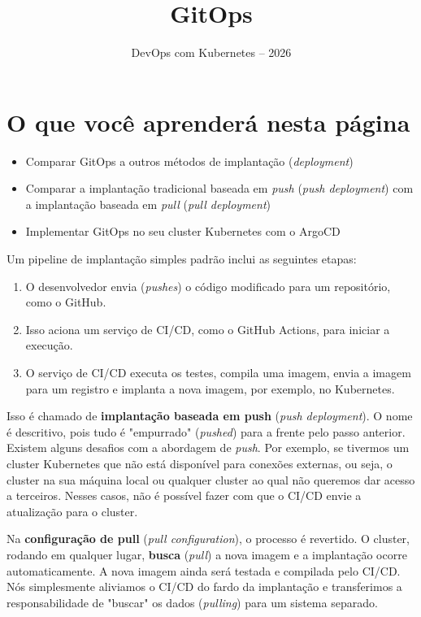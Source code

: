 \documentclass[11pt,a4paper]{article}
\title{\color{secondary}\Huge\textbf{GitOps}}
\author{\color{primary}DevOps com Kubernetes -- 2026}
\date{}
\begin{document}
\maketitle

\section*{\color{primary}O que você aprenderá nesta página}
\begin{itemize}
    \item Comparar GitOps a outros métodos de implantação (\textit{deployment})
    \item Comparar a implantação tradicional baseada em \textit{push} (\textit{push deployment}) com a implantação baseada em \textit{pull} (\textit{pull deployment})
    \item Implementar GitOps no seu cluster Kubernetes com o ArgoCD
\end{itemize}

Um pipeline de implantação simples padrão inclui as seguintes etapas:
\begin{enumerate}
    \item O desenvolvedor envia (\textit{pushes}) o código modificado para um repositório, como o GitHub.
    \item Isso aciona um serviço de CI/CD, como o GitHub Actions, para iniciar a execução.
    \item O serviço de CI/CD executa os testes, compila uma imagem, envia a imagem para um registro e implanta a nova imagem, por exemplo, no Kubernetes.
\end{enumerate}

Isso é chamado de \textbf{implantação baseada em push} (\textit{push deployment}). O nome é descritivo, pois tudo é "empurrado" (\textit{pushed}) para a frente pelo passo anterior. Existem alguns desafios com a abordagem de \textit{push}. Por exemplo, se tivermos um cluster Kubernetes que não está disponível para conexões externas, ou seja, o cluster na sua máquina local ou qualquer cluster ao qual não queremos dar acesso a terceiros. Nesses casos, não é possível fazer com que o CI/CD envie a atualização para o cluster.

Na \textbf{configuração de pull} (\textit{pull configuration}), o processo é revertido. O cluster, rodando em qualquer lugar, \textbf{busca} (\textit{pull}) a nova imagem e a implantação ocorre automaticamente. A nova imagem ainda será testada e compilada pelo CI/CD. Nós simplesmente aliviamos o CI/CD do fardo da implantação e transferimos a responsabilidade de "buscar" os dados (\textit{pulling}) para um sistema separado.
\end{document}
